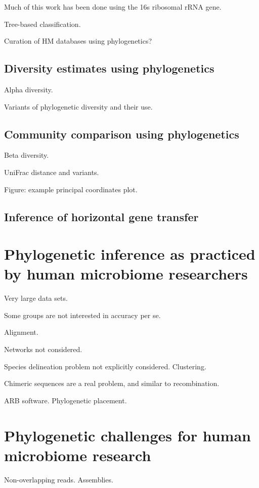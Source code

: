 \documentclass{amsart}
\begin{document}
Much of this work has been done using the 16s ribosomal rRNA gene.

Tree-based classification.

Curation of HM databases using phylogenetics?


\subsection{Diversity estimates using phylogenetics}

Alpha diversity.

Variants of phylogenetic diversity and their use.


\subsection{Community comparison using phylogenetics}

Beta diversity.

UniFrac distance and variants.

Figure: example principal coordinates plot.


\subsection{Inference of horizontal gene transfer}




\section{Phylogenetic inference as practiced by human microbiome researchers}

Very large data sets.

Some groups are not interested in accuracy per se.

Alignment.

Networks not considered.

Species delineation problem not explicitly considered. Clustering.

Chimeric sequences are a real problem, and similar to recombination.

ARB software.
Phylogenetic placement.


\section{Phylogenetic challenges for human microbiome research}

Non-overlapping reads.
Assemblies.
\end{document}
